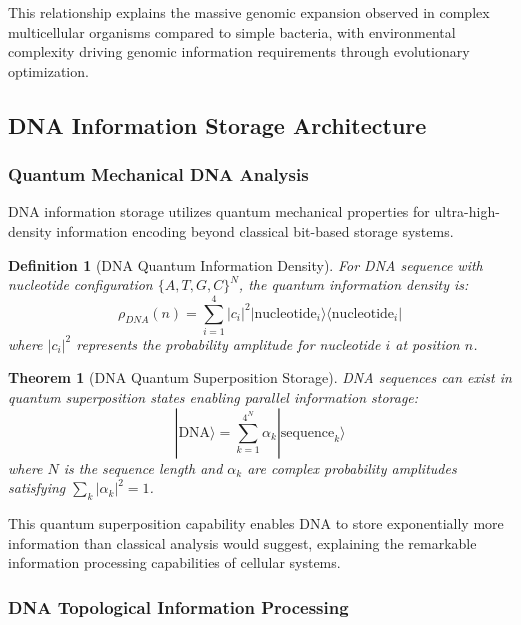 \documentclass[12pt,a4paper]{article}
\newtheorem{theorem}{Theorem}
\newtheorem{definition}{Definition}
\begin{document}
This relationship explains the massive genomic expansion observed in complex multicellular organisms compared to simple bacteria, with environmental complexity driving genomic information requirements through evolutionary optimization.

\subsection{DNA Information Storage Architecture}

\subsubsection{Quantum Mechanical DNA Analysis}

DNA information storage utilizes quantum mechanical properties for ultra-high-density information encoding beyond classical bit-based storage systems.

\begin{definition}[DNA Quantum Information Density]
For DNA sequence with nucleotide configuration $\{A, T, G, C\}^N$, the quantum information density is:
\begin{equation}
\rho_{DNA}(n) = \sum_{i=1}^4 |c_i|^2 |\text{nucleotide}_i\rangle \langle\text{nucleotide}_i|
\end{equation}
where $|c_i|^2$ represents the probability amplitude for nucleotide $i$ at position $n$.
\end{definition}

\begin{theorem}[DNA Quantum Superposition Storage]
DNA sequences can exist in quantum superposition states enabling parallel information storage:
\begin{equation}
|\text{DNA}\rangle = \sum_{k=1}^{4^N} \alpha_k |\text{sequence}_k\rangle
\end{equation}
where $N$ is the sequence length and $\alpha_k$ are complex probability amplitudes satisfying $\sum_k |\alpha_k|^2 = 1$.
\end{theorem}

This quantum superposition capability enables DNA to store exponentially more information than classical analysis would suggest, explaining the remarkable information processing capabilities of cellular systems.

\subsubsection{DNA Topological Information Processing}
\end{document}
